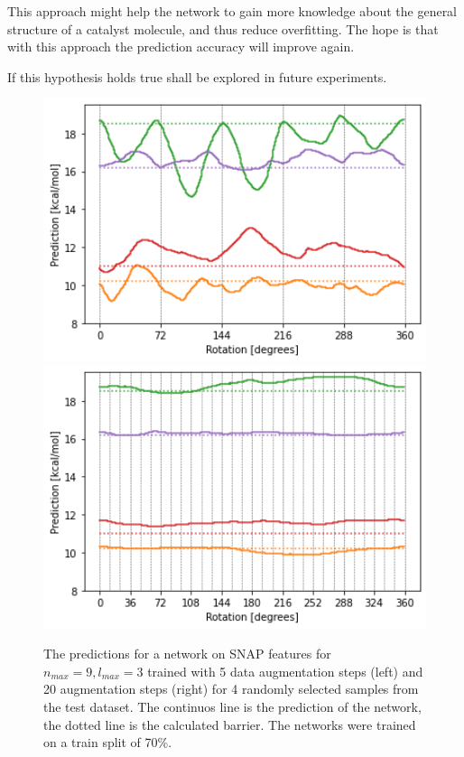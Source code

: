 This approach might help the network to gain more knowledge about the general structure of a catalyst molecule,
and thus reduce overfitting.
The hope is that with this approach the prediction accuracy will improve again.

If this hypothesis holds true shall be explored in future experiments.


\begin{figure}[!htb]
  \centering
    \includegraphics[width=1.0\textwidth]{figures/regression/snap/aug-5steps-30per.png}
  \endminipage\hfill
  \includegraphics[width=1.0\textwidth]{figures/regression/snap/aug-30steps-30per.png}
  \endminipage\hfill
  \caption[Evaluation of SNAP rotational invariance]{
  The predictions for a network on SNAP features for $n_{max}=9, l_{max}=3$ trained with 5 data augmentation steps (left) 
  and 20 augmentation steps (right) for 4 randomly selected samples from the test dataset.
  The continuos line is the prediction of the network, the dotted line is the calculated barrier.
  The networks were trained on a train split of 70\%.
  }
  \label{fig:snap_roation}

\end{figure}


